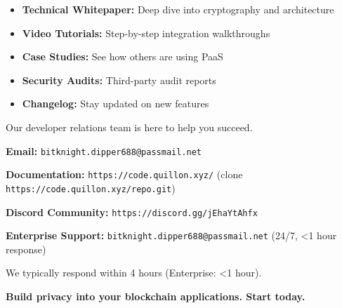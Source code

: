 \documentclass[11pt,a4paper]{article}
\begin{document}
\begin{itemize}
    \item \textbf{Technical Whitepaper:} Deep dive into cryptography and architecture
    \item \textbf{Video Tutorials:} Step-by-step integration walkthroughs
    \item \textbf{Case Studies:} See how others are using PaaS
    \item \textbf{Security Audits:} Third-party audit reports
    \item \textbf{Changelog:} Stay updated on new features
\end{itemize}

\vspace{1cm}

\begin{tcolorbox}[colback=blue!5!white,colframe=blue!75!black,title=Need Help?]
Our developer relations team is here to help you succeed.

\textbf{Email:} \texttt{bitknight.dipper688@passmail.net}

\textbf{Documentation:} \texttt{https://code.quillon.xyz/} (clone \texttt{https://code.quillon.xyz/repo.git})

\textbf{Discord Community:} \texttt{https://discord.gg/jEhaYtAhfx}

\textbf{Enterprise Support:} \texttt{bitknight.dipper688@passmail.net} (24/7, <1 hour response)

We typically respond within 4 hours (Enterprise: <1 hour).
\end{tcolorbox}

\vspace{0.5cm}

\textbf{Build privacy into your blockchain applications. Start today.}
\end{document}
